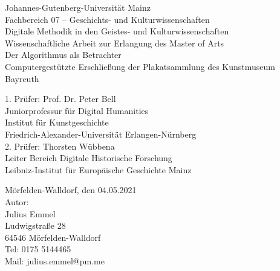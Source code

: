 \documentclass[a4paper,12pt,ngerman]{article}
\begin{document}
	\begin{titlepage}
	\begin{singlespace}
		\begin{center}	
			{\large Johannes-Gutenberg-Universität Mainz}\\
			\vspace{0.5cm}
			{\large Fachbereich 07 -- Geschichts- und Kulturwissenschaften}\\
			\vspace{0.5cm}
			{\large Digitale Methodik in den Geistes- und Kulturwissenschaften}\\
			\vspace{1cm}
			{\large Wissenschaftliche Arbeit zur Erlangung des Master of Arts}\\
			\vspace{2.5cm}
			{\Huge Der Algorithmus als Betrachter}\\
			\vspace{1cm}
			{\large Computergestützte Erschließung der Plakatsammlung des Kunstmuseum Bayreuth}\\
			\vspace{2.5cm}
		\end{center}
			{\large 1. Prüfer: Prof. Dr. Peter Bell\\\hspace*{24mm}Juniorprofessur für Digital Humanities\\\hspace*{24mm}Institut für Kunstgeschichte\\\hspace*{24mm}Friedrich-Alexander-Universität Erlangen-Nürnberg}\\
			{\large 2. Prüfer: Thorsten Wübbena\\\hspace*{24mm}Leiter Bereich Digitale Historische Forschung\\\hspace*{24mm}Leibniz-Institut für Europäische Geschichte Mainz}\\
			\vspace{2cm}
		\begin{flushright}
			{\large Mörfelden-Walldorf, den 04.05.2021}\\
			\vspace{0.5cm}
			{\large Autor: \\ Julius Emmel \\ Ludwigstraße 28 \\ 64546 Mörfelden-Walldorf}\\
			\vspace{0.5cm}
			{\large Tel: 0175 5144465 \\ Mail: julius.emmel@pm.me}
		\end{flushright}
	\restoregeometry
	\end{singlespace}
	\end{titlepage}
\end{document}
